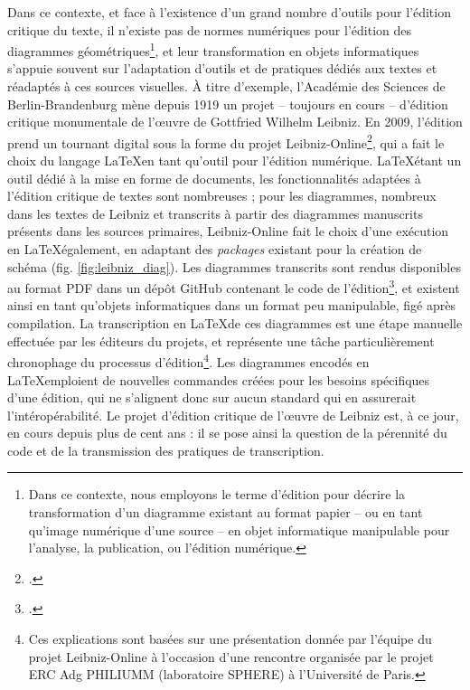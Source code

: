 	Dans ce contexte, et face à l'existence d'un grand nombre d'outils pour l'édition critique du texte, il n'existe pas de normes numériques pour l'édition des diagrammes géométriques\footnote{Dans ce contexte, nous employons le terme d'édition pour décrire la transformation d'un diagramme existant au format papier -- ou en tant qu'image numérique d'une source -- en objet informatique manipulable pour l'analyse, la publication, ou l'édition numérique.}, et leur transformation en objets informatiques s'appuie souvent sur l'adaptation d'outils et de pratiques dédiés aux textes et réadaptés à ces sources visuelles. À titre d'exemple, l'Académie des Sciences de Berlin-Brandenburg mène depuis 1919 un projet -- toujours en cours -- d'édition critique monumentale de l'œuvre de Gottfried Wilhelm Leibniz. En 2009, l'édition prend un tournant digital sous la forme du projet Leibniz-Online\footcite{LeibnizOnlineLeibnizEditionc}, qui a fait le choix du langage \LaTeX en tant qu'outil pour l'édition numérique. \LaTeX étant un outil dédié à la mise en forme de documents, les fonctionnalités adaptées à l'édition critique de textes sont nombreuses ; pour les diagrammes, nombreux dans les textes de Leibniz et transcrits à partir des diagrammes manuscrits présents dans les sources primaires, Leibniz-Online fait le choix d'une exécution en \LaTeX également, en adaptant des \textit{packages} existant pour la création de schéma (fig. \ref{fig:leibniz_diag}). Les diagrammes transcrits sont rendus disponibles au format PDF dans un dépôt GitHub contenant le code de l'édition\footcite{LeibnizVIIILaTeX_TEIa}, et existent ainsi en tant qu'objets informatiques dans un format peu manipulable, figé après compilation. La transcription en \LaTeX de ces diagrammes est une étape manuelle effectuée par les éditeurs du projets, et représente une tâche particulièrement chronophage du processus d'édition\footnote{Ces explications sont basées sur une présentation donnée par l'équipe du projet Leibniz-Online à l'occasion d'une rencontre organisée par le projet ERC Adg PHILIUMM (laboratoire SPHERE) à l'Université de Paris.}. Les diagrammes encodés en \LaTeX emploient de nouvelles commandes créées pour les besoins spécifiques d'une édition, qui ne s'alignent donc sur aucun standard qui en assurerait l'intéropérabilité. Le projet d'édition critique de l'œuvre de Leibniz est, à ce jour, en cours depuis plus de cent ans : il se pose ainsi la question de la pérennité du code et de la transmission des pratiques de transcription. 
	
